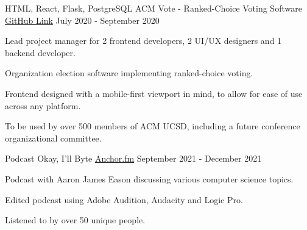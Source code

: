 
\begin{cventries}
  \cventry
    {HTML, React, Flask, PostgreSQL}
    {ACM Vote - Ranked-Choice Voting Software}
    {\href{https://github.com/acmucsd/acm-vote}{GitHub Link}}
    {July 2020 - September 2020}
    {
      \begin{cvitems}
        \item {Lead project manager for 2 frontend developers, 2 UI/UX designers and 1 backend developer.}
        \item {Organization election software implementing ranked-choice voting.}
        \item {Frontend designed with a mobile-first viewport in mind, to allow for ease of use across any platform.}
        \item {To be used by over 500 members of ACM UCSD, including a future conference organizational committee.}
      \end{cvitems}
    }
  \cventry
    {Podcast}
    {Okay, I'll Byte}
    {\href{https://anchor.fm/acm-podcast}{Anchor.fm}}
    {September 2021 - December 2021}
    {
      \begin{cvitems}
        \item {Podcast with Aaron James Eason discussing various computer science topics.}
        \item {Edited podcast using Adobe Audition, Audacity and Logic Pro.}
        \item {Listened to by over 50 unique people.}
      \end{cvitems}
    }  

\end{cventries}

